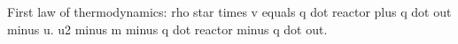 First law of thermodynamics:  
rho star times v equals q dot reactor plus q dot out minus u.  
u2 minus m minus q dot reactor minus q dot out.